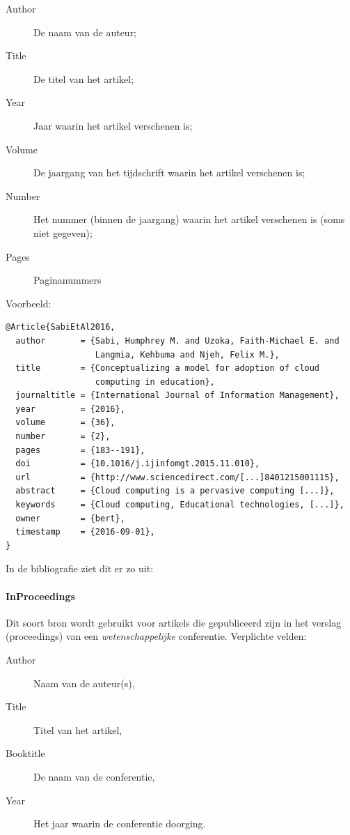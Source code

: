 \begin{description}
\item[Author] De naam van de auteur;
\item[Title] De titel van het artikel;
\item[Year] Jaar waarin het artikel verschenen is;
\item[Volume] De jaargang van het tijdschrift waarin het artikel verschenen is;
\item[Number] Het nummer (binnen de jaargang) waarin het artikel verschenen is (soms niet gegeven);
\item[Pages] Paginanummers
\end{description}

Voorbeeld:
\begin{verbatim}
@Article{SabiEtAl2016,
  author       = {Sabi, Humphrey M. and Uzoka, Faith-Michael E. and
                  Langmia, Kehbuma and Njeh, Felix M.},
  title        = {Conceptualizing a model for adoption of cloud
                  computing in education},
  journaltitle = {International Journal of Information Management},
  year         = {2016},
  volume       = {36},
  number       = {2},
  pages        = {183--191},
  doi          = {10.1016/j.ijinfomgt.2015.11.010},
  url          = {http://www.sciencedirect.com/[...]8401215001115},
  abstract     = {Cloud computing is a pervasive computing [...]},
  keywords     = {Cloud computing, Educational technologies, [...]},
  owner        = {bert},
  timestamp    = {2016-09-01},
}
\end{verbatim}

In de bibliografie ziet dit er zo uit: 

\paragraph{InProceedings}

Dit soort bron wordt gebruikt voor artikels die gepubliceerd zijn in het verslag (proceedings) van een \emph{wetenschappelijke} conferentie. Verplichte velden:

\begin{description}
  \item[Author] Naam van de auteur(s),
  \item[Title] Titel van het artikel,
  \item[Booktitle] De naam van de conferentie,
  \item[Year] Het jaar waarin de conferentie doorging.
\end{description}

